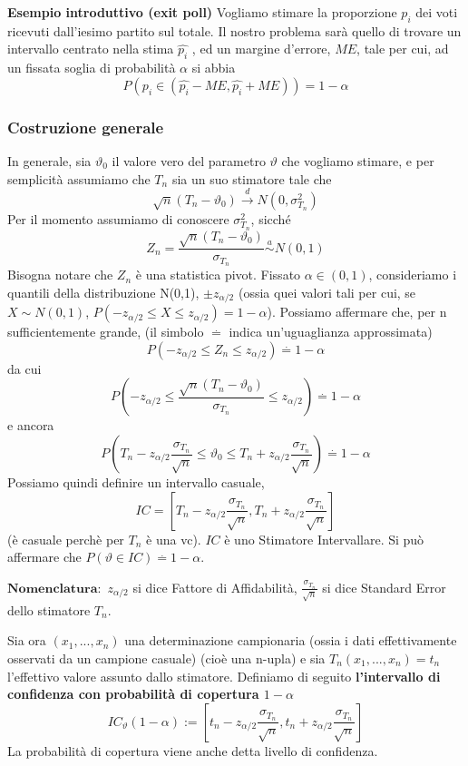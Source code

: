 \textbf{Esempio introduttivo (exit poll)}
Vogliamo stimare la proporzione $p_i$ dei voti ricevuti dall'iesimo partito sul totale. Il nostro problema sarà quello di trovare un intervallo centrato nella stima $\hat{p_i}$ , ed un margine d'errore, $ME$, tale per cui, ad un fissata soglia di probabilità $\alpha$ si abbia $$P(p_i \in (\hat{p_i} - ME,\hat{p_i} + ME))=1 - \alpha$$
\subsubsection{Costruzione generale}
In generale, sia $\vartheta_0$ il valore vero del parametro $\vartheta$ che vogliamo stimare, e per semplicità assumiamo che $T_n$ sia un suo stimatore tale che 
$$\sqrt{n}(T_n - \vartheta_0)\stackrel{d}{\rightarrow}N(0,\sigma_{T_n}^2)$$
Per il momento assumiamo di conoscere $\sigma_{T_n}^2$, sicché
$$Z_n=\frac{\sqrt{n}(T_n - \vartheta_0)}{\sigma_{T_n}} \stackrel{a}{\sim}N(0,1)$$ Bisogna notare che $Z_n$ è una statistica pivot.
Fissato $\alpha \in (0,1)$, consideriamo i quantili della distribuzione N(0,1), $\pm z_{\alpha / 2}$ (ossia quei valori tali per cui, se $X \sim N(0,1)$, $P(-z_{\alpha / 2} \leq X \leq z_{\alpha / 2})=1-\alpha$). Possiamo affermare che, per n sufficientemente grande, (il simbolo $\stackrel{.}{=}$ indica un'uguaglianza approssimata) $$P(-z_{\alpha / 2} \leq Z_n \leq z_{\alpha / 2})\stackrel{.}{=}1-\alpha$$ da cui
$$P(-z_{\alpha / 2} \leq \frac{\sqrt{n}(T_n - \vartheta_0)}{\sigma_{T_n}} \leq z_{\alpha / 2})\stackrel{.}{=}1-\alpha $$ e ancora
$$P(T_n - z_{\alpha / 2} \frac{\sigma_{T_n}}{\sqrt{n}} \leq \vartheta_0 \leq T_n+z_{\alpha / 2} \frac{\sigma_{T_n}}{\sqrt{n}})\stackrel{.}{=}1-\alpha$$
Possiamo quindi definire un intervallo casuale, $$IC=\left[T_n - z_{\alpha / 2} \frac{\sigma_{T_n}}{\sqrt{n}},T_n + z_{\alpha / 2} \frac{\sigma_{T_n}}{\sqrt{n}}\right]$$ (è casuale perchè per $T_n$ è una vc). $IC$ è uno Stimatore Intervallare.
Si può affermare che $P(\vartheta \in IC) \stackrel {.}{=} 1 - \alpha$.

$\textbf{Nomenclatura}:$
$z_{\alpha / 2}$ si dice Fattore di Affidabilità,
$\frac{\sigma_{T_n}}{\sqrt{n}}$ si dice Standard Error dello stimatore $T_n$.

Sia ora $(x_1,...,x_n)$ una determinazione campionaria (ossia i dati effettivamente osservati da un campione casuale) (cioè una n-upla) e sia $T_n(x_1,...,x_n)=t_n$ l'effettivo valore assunto dallo stimatore.
Definiamo di seguito \textbf{l'intervallo di confidenza con probabilità di copertura $1-\alpha$} $$IC_\vartheta (1-\alpha) := \left[t_n - z_{\alpha / 2} \frac{\sigma_{T_n}}{\sqrt{n}}, t_n + z_{\alpha / 2} \frac{\sigma_{T_n}}{\sqrt{n}}\right]$$
La probabilità di copertura viene anche detta livello di confidenza.


